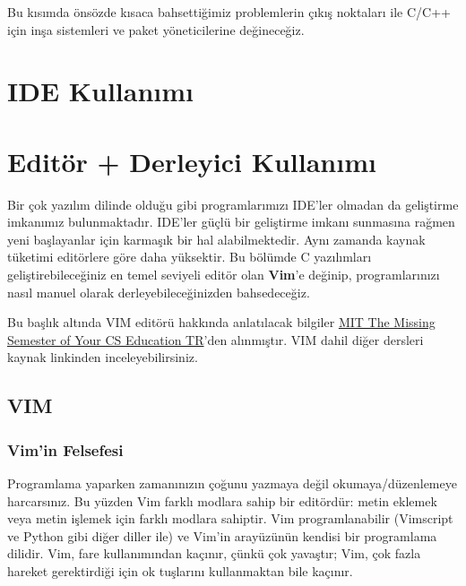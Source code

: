 \documentclass[
]{book}
\begin{document}
Bu kısımda önsözde kısaca bahsettiğimiz problemlerin çıkış noktaları ile C/C++ için inşa sistemleri ve paket yöneticilerine değineceğiz.

\hypertarget{ide-kullanux131mux131}{%
\section{IDE Kullanımı}\label{ide-kullanux131mux131}}

\hypertarget{edituxf6r-derleyici-kullanux131mux131}{%
\section{Editör + Derleyici Kullanımı}\label{edituxf6r-derleyici-kullanux131mux131}}

Bir çok yazılım dilinde olduğu gibi programlarımızı IDE'ler olmadan da geliştirme imkanımız bulunmaktadır. IDE'ler güçlü bir geliştirme imkanı sunmasına rağmen yeni başlayanlar için karmaşık bir hal alabilmektedir. Aynı zamanda kaynak tüketimi editörlere göre daha yüksektir. Bu bölümde C yazılımları geliştirebileceğiniz en temel seviyeli editör olan \textbf{Vim}'e değinip, programlarınızı nasıl manuel olarak derleyebileceğinizden bahsedeceğiz.

Bu başlık altında VIM editörü hakkında anlatılacak bilgiler \href{https://missing-semester-tr.github.io/}{MIT \textbar{} The Missing Semester of Your CS Education TR}'den alınmıştır. VIM dahil diğer dersleri kaynak linkinden inceleyebilirsiniz.

\hypertarget{vim}{%
\subsection{VIM}\label{vim}}

\hypertarget{vimin-felsefesi}{%
\subsubsection{Vim'in Felsefesi}\label{vimin-felsefesi}}

Programlama yaparken zamanınızın çoğunu yazmaya değil okumaya/düzenlemeye harcarsınız. Bu yüzden Vim farklı modlara sahip bir editördür: metin eklemek veya metin işlemek için farklı modlara sahiptir. Vim programlanabilir (Vimscript ve Python gibi diğer diller ile) ve Vim'in arayüzünün kendisi bir programlama dilidir. Vim, fare kullanımından kaçınır, çünkü çok yavaştır; Vim, çok fazla hareket gerektirdiği için ok tuşlarını kullanmaktan bile kaçınır.
\end{document}
